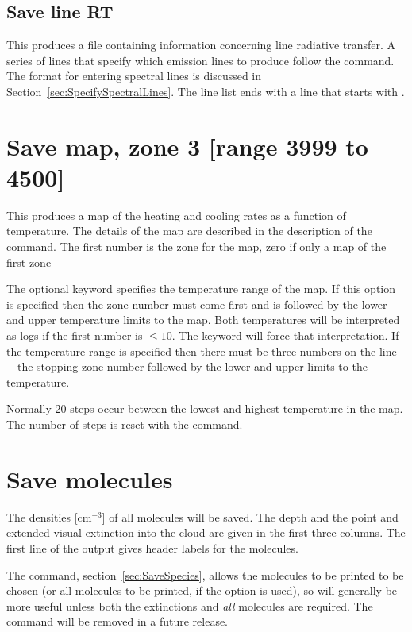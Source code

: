\subsection{Save line RT}

This produces a file containing information concerning line radiative
transfer. A series of lines that specify which emission lines to produce
follow the command. The format for entering spectral lines is discussed in
Section~\ref{sec:SpecifySpectralLines}. The line list ends with a line that
starts with .

\section{Save map, zone 3 [range 3999 to 4500]}

This produces a map of the heating and cooling rates as a function of
temperature.  The details of the map are described in the description of
the  command.
The first number is the zone
for the map, zero if only a map of the first zone

The optional keyword  specifies the temperature range of the map.
If this option is specified then the zone number must come first and is
followed by the lower and upper temperature limits to the map.
Both
temperatures will be interpreted as logs if the first number is $\leq 10$.
The keyword  will force that interpretation.  If the temperature range
is specified then there must be three numbers on the line---the stopping
zone number followed by the lower and upper limits to the temperature.

Normally 20 steps occur between the lowest and highest temperature in
the map.
The number of steps is reset with the  command.

\section{Save molecules}

The densities [cm$^{-3}$] of all molecules will be saved.  The depth and
the point and extended visual extinction into the cloud are given in the
first three columns.  The first line of the output gives header labels for
the molecules.

The  command, section~\ref{sec:SaveSpecies},
allows the molecules to be printed to be chosen (or all molecules to
be printed, if the  option is used), so will generally
be more useful unless both the extinctions and {\em all}\/ molecules
are required.  The  command will be removed
in a future release.

